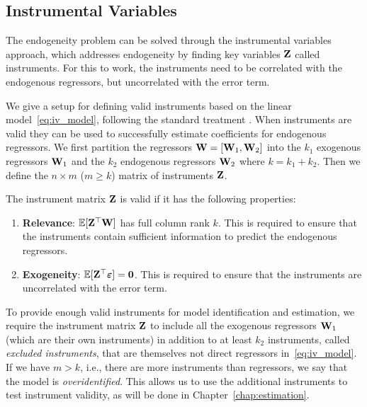 \subsection{Instrumental Variables}

The endogeneity problem can be solved through the instrumental variables approach, which addresses endogeneity by finding key variables $\mathbf{Z}$ called instruments. For this to work, the instruments need to be correlated with the endogenous regressors, but uncorrelated with the error term.

We give a setup for defining valid instruments based on the linear model~\eqref{eq:iv_model}, following the standard treatment \parencite[Sec.~4.1]{Angrist2009}. When instruments are valid they can be used to successfully estimate coefficients for endogenous regressors. We first partition the regressors $\mathbf{W} = [\mathbf{W}_1, \mathbf{W}_2]$ into the $k_1$ exogenous regressors $\mathbf{W}_1$ and the $k_2$ endogenous regressors $\mathbf{W}_2$ where $k = k_1 + k_2$. Then we define the $n \times m$ ($m \geq k$) matrix of instruments $\mathbf{Z}$.

\begin{definition}
\label{def:valid_instruments}
The instrument matrix $\mathbf{Z}$ is valid if it has the following properties:
\begin{enumerate}
    \item \textbf{Relevance}: $\mathbb{E}[\mathbf{Z}^\top\mathbf{W}]$ has full column rank $k$. This is required to ensure that the instruments contain sufficient information to predict the endogenous regressors.
    \item \textbf{Exogeneity}: $\mathbb{E}[\mathbf{Z}^\top\bm{\varepsilon}] = \bm{0}$. This is required to ensure that the instruments are uncorrelated with the error term.
\end{enumerate}
\end{definition}

To provide enough valid instruments for model identification and estimation, we require the instrument matrix $\mathbf{Z}$ to include all the exogenous regressors $\mathbf{W}_1$ (which are their own instruments) in addition to at least $k_2$ instruments, called \emph{excluded instruments}, that are themselves not direct regressors in~\eqref{eq:iv_model}. If we have $m > k$, i.e., there are more instruments than regressors, we say that the model is \emph{overidentified}. This allows us to use the additional instruments to test instrument validity, as will be done in Chapter~\ref{chap:estimation}.


